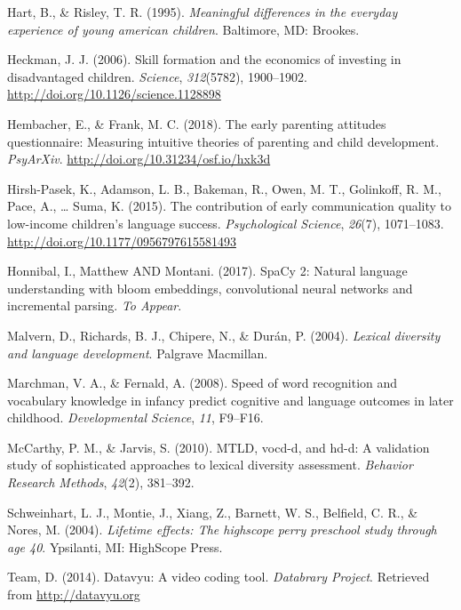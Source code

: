 \documentclass[man,floatsintext]{apa6}
\begin{document}
\leavevmode\hypertarget{ref-Hart1995}{}%
Hart, B., \& Risley, T. R. (1995). \emph{Meaningful differences in the everyday experience of young american children}. Baltimore, MD: Brookes.

\leavevmode\hypertarget{ref-Heckman2006}{}%
Heckman, J. J. (2006). Skill formation and the economics of investing in disadvantaged children. \emph{Science}, \emph{312}(5782), 1900--1902. \url{http://doi.org/10.1126/science.1128898}

\leavevmode\hypertarget{ref-Hembacher2018}{}%
Hembacher, E., \& Frank, M. C. (2018). The early parenting attitudes questionnaire: Measuring intuitive theories of parenting and child development. \emph{PsyArXiv}. \url{http://doi.org/10.31234/osf.io/hxk3d}

\leavevmode\hypertarget{ref-HirshPasek2015}{}%
Hirsh-Pasek, K., Adamson, L. B., Bakeman, R., Owen, M. T., Golinkoff, R. M., Pace, A., \ldots{} Suma, K. (2015). The contribution of early communication quality to low-income children's language success. \emph{Psychological Science}, \emph{26}(7), 1071--1083. \url{http://doi.org/10.1177/0956797615581493}

\leavevmode\hypertarget{ref-spacy2}{}%
Honnibal, I., Matthew AND Montani. (2017). SpaCy 2: Natural language understanding with bloom embeddings, convolutional neural networks and incremental parsing. \emph{To Appear}.

\leavevmode\hypertarget{ref-Malvern2004}{}%
Malvern, D., Richards, B. J., Chipere, N., \& Durán, P. (2004). \emph{Lexical diversity and language development}. Palgrave Macmillan.

\leavevmode\hypertarget{ref-Marchman2008}{}%
Marchman, V. A., \& Fernald, A. (2008). Speed of word recognition and vocabulary knowledge in infancy predict cognitive and language outcomes in later childhood. \emph{Developmental Science}, \emph{11}, F9--F16.

\leavevmode\hypertarget{ref-McCarthy2010}{}%
McCarthy, P. M., \& Jarvis, S. (2010). MTLD, vocd-d, and hd-d: A validation study of sophisticated approaches to lexical diversity assessment. \emph{Behavior Research Methods}, \emph{42}(2), 381--392.

\leavevmode\hypertarget{ref-PerryPreschool2004}{}%
Schweinhart, L. J., Montie, J., Xiang, Z., Barnett, W. S., Belfield, C. R., \& Nores, M. (2004). \emph{Lifetime effects: The highscope perry preschool study through age 40}. Ypsilanti, MI: HighScope Press.

\leavevmode\hypertarget{ref-datavyu}{}%
Team, D. (2014). Datavyu: A video coding tool. \emph{Databrary Project}. Retrieved from \url{http://datavyu.org}
\end{document}
